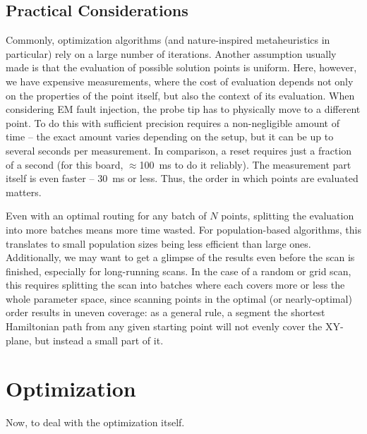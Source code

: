 \documentclass[times, utf8, diplomski]{fer}
\begin{document}
\section{Practical Considerations}\label{sec:practical_considerations}
Commonly, optimization algorithms (and nature-inspired metaheuristics in
particular) rely on a large number of iterations. Another assumption usually
made is that the evaluation of possible solution points is uniform. Here,
however, we have expensive measurements, where the cost of evaluation depends
not only on the properties of the point itself, but also the context of its
evaluation.
%
When considering EM fault injection, the probe tip has to physically move to
a different point. To do this with sufficient precision requires a non-negligible
amount of time -- the exact amount varies depending on the setup, but it can be
up to several seconds per measurement. In comparison, a reset requires just a
fraction of a second (for this board, $\approx$\SI{100}{\milli\second} to do it
reliably). The measurement part itself is even faster -- \SI{30}{\milli\second}
or less. Thus, the order in which points are evaluated matters.

Even with an optimal routing for any batch of $N$ points, splitting the
evaluation into more batches means more time wasted. For population-based
algorithms, this translates to small population sizes being less efficient
than large ones. Additionally, we may want to get a glimpse of the results
even before the scan is finished, especially for long-running scans. In the
case of a random or grid scan, this requires splitting the scan into batches
where each covers more or less the whole parameter space, since scanning points
in the optimal (or nearly-optimal) order results in uneven coverage: as a
general rule, a segment the shortest Hamiltonian path from any given starting
point will not evenly cover the XY-plane, but instead a small part of it.





\chapter{Optimization}\label{ch:optimization}
Now, to deal with the optimization itself.
\end{document}
